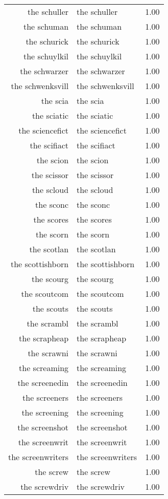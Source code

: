 \begin{table}[ht]
\begin{tabular}{rlr}
  the schuller & the schuller & 1.00 \\ 
  the schuman & the schuman & 1.00 \\ 
  the schurick & the schurick & 1.00 \\ 
  the schuylkil & the schuylkil & 1.00 \\ 
  the schwarzer & the schwarzer & 1.00 \\ 
  the schwenksvill & the schwenksvill & 1.00 \\ 
  the scia & the scia & 1.00 \\ 
  the sciatic & the sciatic & 1.00 \\ 
  the sciencefict & the sciencefict & 1.00 \\ 
  the scifiact & the scifiact & 1.00 \\ 
  the scion & the scion & 1.00 \\ 
  the scissor & the scissor & 1.00 \\ 
  the scloud & the scloud & 1.00 \\ 
  the sconc & the sconc & 1.00 \\ 
  the scores & the scores & 1.00 \\ 
  the scorn & the scorn & 1.00 \\ 
  the scotlan & the scotlan & 1.00 \\ 
  the scottishborn & the scottishborn & 1.00 \\ 
  the scourg & the scourg & 1.00 \\ 
  the scoutcom & the scoutcom & 1.00 \\ 
  the scouts & the scouts & 1.00 \\ 
  the scrambl & the scrambl & 1.00 \\ 
  the scrapheap & the scrapheap & 1.00 \\ 
  the scrawni & the scrawni & 1.00 \\ 
  the screaming & the screaming & 1.00 \\ 
  the screenedin & the screenedin & 1.00 \\ 
  the screeners & the screeners & 1.00 \\ 
  the screening & the screening & 1.00 \\ 
  the screenshot & the screenshot & 1.00 \\ 
  the screenwrit & the screenwrit & 1.00 \\ 
  the screenwriters & the screenwriters & 1.00 \\ 
  the screw & the screw & 1.00 \\ 
  the screwdriv & the screwdriv & 1.00 \\ 

\end{tabular}
\end{table}
